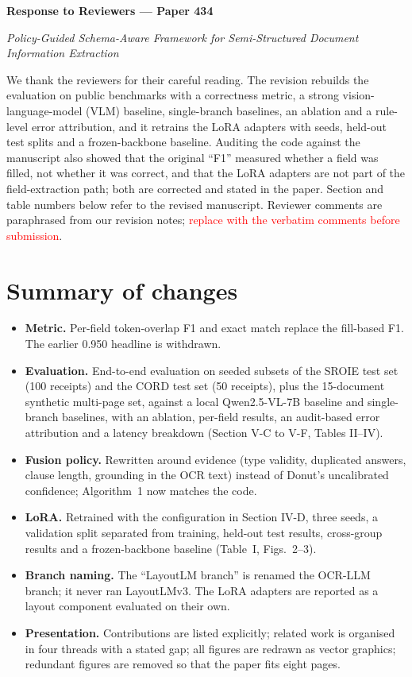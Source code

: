 \documentclass[11pt]{article}
\begin{document}
\begin{center}\Large\textbf{Response to Reviewers --- Paper 434}\end{center}
\begin{center}\textit{Policy-Guided Schema-Aware Framework for Semi-Structured Document Information Extraction}\end{center}

We thank the reviewers for their careful reading. The revision rebuilds the evaluation on public benchmarks with a correctness metric, a strong vision-language-model (VLM) baseline, single-branch baselines, an ablation and a rule-level error attribution, and it retrains the LoRA adapters with seeds, held-out test splits and a frozen-backbone baseline. Auditing the code against the manuscript also showed that the original ``F1'' measured whether a field was filled, not whether it was correct, and that the LoRA adapters are not part of the field-extraction path; both are corrected and stated in the paper. Section and table numbers below refer to the revised manuscript. Reviewer comments are paraphrased from our revision notes; \textcolor{red}{replace with the verbatim comments before submission}.

\section*{Summary of changes}
\begin{itemize}[leftmargin=*,nosep]
\item \textbf{Metric.} Per-field token-overlap F1 and exact match replace the fill-based F1. The earlier 0.950 headline is withdrawn.
\item \textbf{Evaluation.} End-to-end evaluation on seeded subsets of the SROIE test set (100 receipts) and the CORD test set (50 receipts), plus the 15-document synthetic multi-page set, against a local Qwen2.5-VL-7B baseline and single-branch baselines, with an ablation, per-field results, an audit-based error attribution and a latency breakdown (Section V-C to V-F, Tables II--IV).
\item \textbf{Fusion policy.} Rewritten around evidence (type validity, duplicated answers, clause length, grounding in the OCR text) instead of Donut's uncalibrated confidence; Algorithm~1 now matches the code.
\item \textbf{LoRA.} Retrained with the configuration in Section IV-D, three seeds, a validation split separated from training, held-out test results, cross-group results and a frozen-backbone baseline (Table~I, Figs.~2--3).
\item \textbf{Branch naming.} The ``LayoutLM branch'' is renamed the OCR-LLM branch; it never ran LayoutLMv3. The LoRA adapters are reported as a layout component evaluated on their own.
\item \textbf{Presentation.} Contributions are listed explicitly; related work is organised in four threads with a stated gap; all figures are redrawn as vector graphics; redundant figures are removed so that the paper fits eight pages.
\end{itemize}
\end{document}
